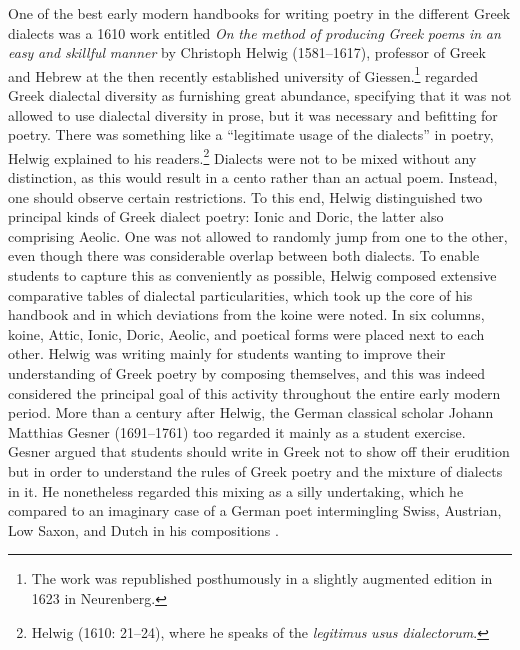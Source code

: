 One of the best early modern handbooks for writing poetry in the different Greek dialects was a 1610 work entitled \textit{On} \textit{the} \textit{method} \textit{of} \textit{producing} \textit{Greek} \textit{poems} \textit{in} \textit{an} \textit{easy} \textit{and} \textit{skillful} \textit{manner} by Christoph Helwig (1581–1617), professor of Greek and Hebrew at the then recently established university of Giessen.\footnote{The work was republished posthumously in a slightly augmented edition in 1623 in Neurenberg.} \citet[19]{Helwig1610} regarded Greek dialectal diversity as furnishing great abundance, specifying that it was not allowed to use dialectal diversity in prose, but it was necessary and befitting for poetry. There was something like a “legitimate usage of the dialects” in poetry, Helwig explained to his readers.\footnote{Helwig (1610: 21–24), where he speaks of the \textit{legitimus} \textit{usus} \textit{dialectorum}.} Dialects were not to be mixed without any distinction, as this would result in a cento rather than an actual poem. Instead, one should observe certain restrictions. To this end, Helwig distinguished two principal kinds of Greek dialect poetry: Ionic and Doric, the latter also comprising Aeolic. One was not allowed to randomly jump from one to the other, even though there was considerable overlap between both dialects. To enable students to capture this as conveniently as possible, Helwig composed extensive comparative tables of dialectal particularities, which took up the core of his handbook and in which deviations from the koine were noted. In six columns, koine, Attic, Ionic, Doric, Aeolic, and poetical forms were placed next to each other. Helwig was writing mainly for students wanting to improve their understanding of Greek poetry by composing themselves, and this was indeed considered the principal goal of this activity throughout the entire early modern period. More than a century after Helwig, the German classical scholar Johann Matthias Gesner (1691–1761) too regarded it mainly as a student exercise. Gesner argued that students should write in Greek not to show off their erudition but in order to understand the rules of Greek poetry and the mixture of dialects in it. He nonetheless regarded this mixing as a silly undertaking, which he compared to an imaginary case of a German poet intermingling Swiss, Austrian, Low Saxon, and Dutch in his compositions \citep[162]{Gesner1774}.

